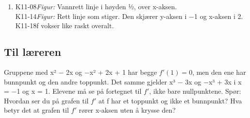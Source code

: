 \documentclass[11pt,a4paper]{article}
\begin{document}
\begin{enumerate}[leftmargin=1.6em, itemsep=0.7em]
\item \begin{minipage}[t]{\linewidth}\textsf{\small K11-08}\quad \emph{Figur:} Vannrett linje i høyden ½, over x-aksen. \\ \textsf{\small K11-14}\quad \emph{Figur:} Rett linje som stiger. Den skjærer y-aksen i −1 og x-aksen i 2. \\ \textsf{\small K11-18}\quad f vokser like raskt overalt.\end{minipage}
\end{enumerate}
\subsection*{Til læreren}
Gruppene med x² − 2x og −x² + 2x + 1 har begge $f'(1) = 0$, men den ene har bunnpunkt og den andre toppunkt. Det samme gjelder x³ − 3x og −x³ + 3x i x = −1 og x = 1. Elevene må se på fortegnet til $f'$, ikke bare nullpunktene. Spør: Hvordan ser du på grafen til $f'$ at f har et toppunkt og ikke et bunnpunkt? Hva betyr det at grafen til $f'$ rører x-aksen uten å krysse den?
\end{document}
